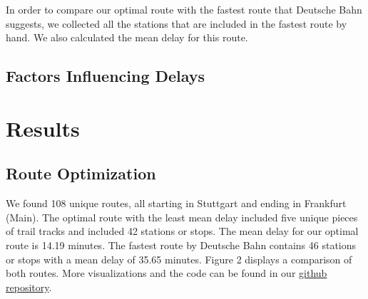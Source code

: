 \documentclass{article}
\theoremstyle{plain}
\theoremstyle{definition}
\theoremstyle{remark}
\begin{document}
In order to compare our optimal route with the fastest route that Deutsche Bahn suggests, we collected all the stations that are included in the fastest route by hand. We also calculated the mean delay for this route.

\subsection{Factors Influencing Delays}\label{sec:methods_ext}

%

\section{Results}\label{sec:results}

\subsection{Route Optimization}\label{sec:results_route}

We found 108 unique routes, all starting in Stuttgart and ending in Frankfurt (Main). The optimal route with the least mean delay included five unique pieces of trail tracks and included 42 stations or stops. The mean delay for our optimal route is 14.19 minutes. The fastest route by Deutsche Bahn contains 46 stations or stops with a mean delay of 35.65 minutes. Figure 2 displays a comparison of both routes. More visualizations and the code can be found in our \href{https://github.com/frederikpanse/db_project}{github repository}.
\end{document}

